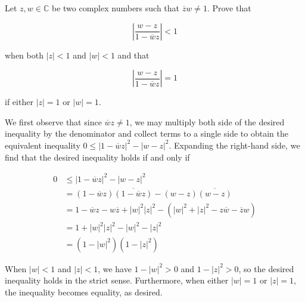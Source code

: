 Let $z, w \in \mathbb{C}$ be two complex numbers such that $\overline{z} w \neq 1$. Prove that 

$$
\left| \frac{w - z}{1 - \overline{w}z} \right| < 1
$$

when both $|z| < 1$ and $|w| < 1$ and that 

$$
\left| \frac{w - z}{1 - \overline{w}z} \right| = 1
$$

if either $|z| = 1$ or $|w| = 1$.

\begin{solution}
    We first observe that since $\overline{w}z \neq 1$, we may multiply both side of the desired inequality by the 
    denominator and collect terms to a single side to obtain the equivalent inequality 
    $0 \le \left| 1 - \overline{w}z \right|^2 - \left| w - z \right|^2$. Expanding the right-hand side, we find that the
    desired inequality holds if and only if

    \begin{align*}
        0 &\le \left| 1 - \overline{w}z \right|^2 - \left| w - z \right|^2 \\
          &= (1 - \overline{w}z) \overline{(1 - \overline{w}z)} - (w - z) \overline{(w - z)} \\
          &= 1 - \overline{w} z - w \overline{z} + |w|^2 |z|^2 - \left(|w|^2 + |z|^2 - z \overline{w} - \overline{z} w\right) \\
          &= 1 + |w|^2 |z|^2 - |w|^2 - |z|^2 \\
          &= (1 - |w|^2)(1 - |z|^2)
    \end{align*}

    When $|w| < 1$ and $|z| < 1$, we have $1 - |w|^2 > 0$ and $1 - |z|^2 > 0$, so the desired inequality holds in the 
    strict sense. Furthermore, when either $|w| = 1$ or $|z| = 1$, the inequality becomes equality, as desired.
    \ \\
\end{solution}